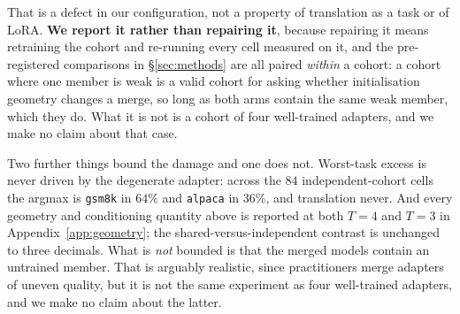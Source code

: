 That is a defect in our configuration, not a property of translation as a
task or of LoRA. \textbf{We report it rather than repairing it}, because
repairing it means retraining the cohort and re-running every cell measured
on it, and the pre-registered comparisons in \S\ref{sec:methods} are all
paired \emph{within} a cohort: a cohort where one member is weak is a valid
cohort for asking whether initialisation geometry changes a merge, so long
as both arms contain the same weak member, which they do. What it is not is
a cohort of four well-trained adapters, and we make no claim about that
case.

Two further things bound the damage and one does not. Worst-task excess is never
driven by the degenerate adapter: across the $84$ independent-cohort cells the
argmax is \texttt{gsm8k} in $64\%$ and \texttt{alpaca} in $36\%$, and
translation never. And every geometry and conditioning quantity above is
reported at both $T=4$ and $T=3$ in Appendix~\ref{app:geometry}; the
shared-versus-independent contrast is unchanged to three decimals. What is
\emph{not} bounded is that the merged models contain an untrained member. That
is arguably realistic, since practitioners merge adapters of uneven quality,
but it is not the same experiment as four well-trained adapters, and we make
no claim about the latter.
